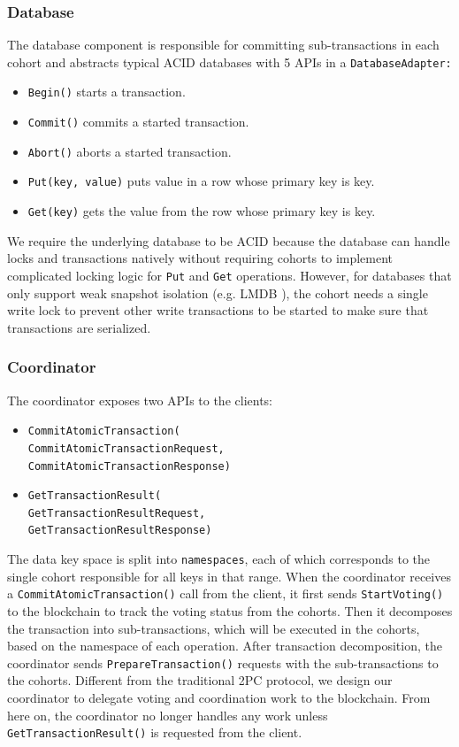 \documentclass[11pt,sigplan,screen,nonacm]{acmart}
\begin{document}
\subsubsection{Database} \label{database}
The database component is responsible for committing sub-transactions in each cohort and abstracts typical ACID databases with 5 APIs in a \texttt{DatabaseAdapter:} 
\begin{itemize}
  \item \texttt{Begin()} starts a transaction.
  \item \texttt{Commit()} commits a started transaction.
  \item \texttt{Abort()} aborts a started transaction.
  \item \texttt{Put(key, value)} puts value in a row whose primary key is key.
  \item \texttt{Get(key)} gets the value from the row whose primary key is key.
\end{itemize}

We require the underlying database to be ACID because the database can handle locks and transactions natively without requiring cohorts to implement complicated locking logic for \texttt{Put} and \texttt{Get} operations. However, for databases that only support weak snapshot isolation (e.g. LMDB \cite{henry2019howard}), the cohort needs a single write lock to prevent other write transactions to be started to make sure that transactions are serialized. 

\subsubsection{Coordinator} \label{coordinator}
The coordinator exposes two APIs to the clients:
\begin{itemize}
  \item \texttt{CommitAtomicTransaction(\\CommitAtomicTransactionRequest,\\CommitAtomicTransactionResponse)}
  \item \texttt{GetTransactionResult(\\GetTransactionResultRequest,\\GetTransactionResultResponse)}
\end{itemize}   

The data key space is split into \texttt{namespaces}, each of which corresponds to the single cohort responsible for all keys in that range. When the coordinator receives a \texttt{CommitAtomicTransaction()} call from the client, it first sends \texttt{StartVoting()} to the blockchain to track the voting status from the cohorts. Then it decomposes the transaction into sub-transactions, which will be executed in the cohorts, based on the namespace of each operation. After transaction decomposition, the coordinator sends \texttt{PrepareTransaction()} requests with the sub-transactions to the cohorts. Different from the traditional 2PC protocol, we design our coordinator to delegate voting and coordination work to the blockchain. From here on, the coordinator no longer handles any work unless \texttt{GetTransactionResult()} is requested from the client.
\end{document}
